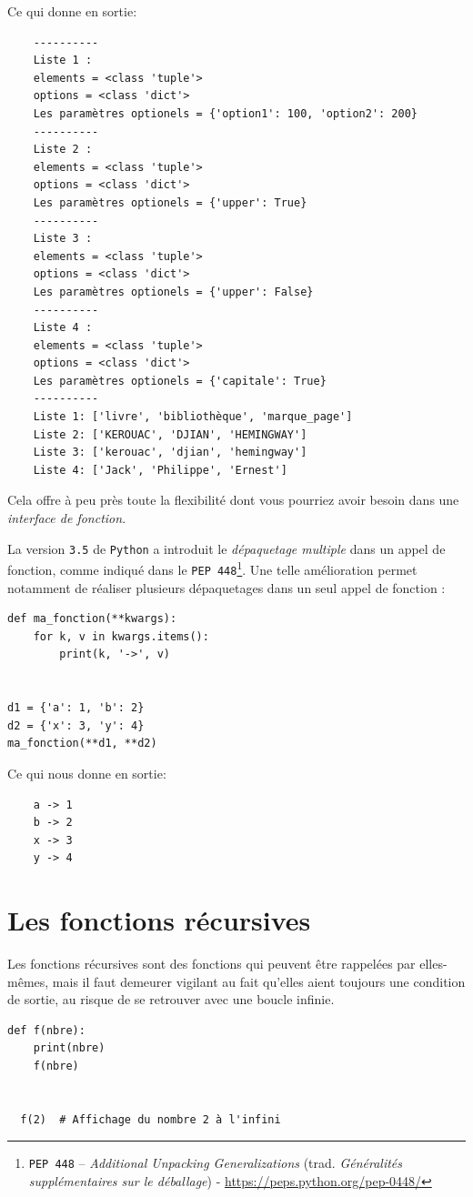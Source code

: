 \documentclass[a4paper,12pt]{book}
\begin{document}
Ce qui donne en sortie:
\begin{verbatim}
    ----------
    Liste 1 : 
    elements = <class 'tuple'>
    options = <class 'dict'>
    Les paramètres optionels = {'option1': 100, 'option2': 200}
    ----------
    Liste 2 : 
    elements = <class 'tuple'>
    options = <class 'dict'>
    Les paramètres optionels = {'upper': True}
    ----------
    Liste 3 : 
    elements = <class 'tuple'>
    options = <class 'dict'>
    Les paramètres optionels = {'upper': False}
    ----------
    Liste 4 : 
    elements = <class 'tuple'>
    options = <class 'dict'>
    Les paramètres optionels = {'capitale': True}
    ----------
    Liste 1: ['livre', 'bibliothèque', 'marque_page']
    Liste 2: ['KEROUAC', 'DJIAN', 'HEMINGWAY']
    Liste 3: ['kerouac', 'djian', 'hemingway']
    Liste 4: ['Jack', 'Philippe', 'Ernest']   
\end{verbatim}
\medskip

Cela offre à peu près toute la flexibilité dont vous pourriez avoir besoin dans une \textit{interface de fonction}.
\medskip

La version \texttt{3.5} de \texttt{Python} a introduit le \textit{dépaquetage multiple} dans un appel de fonction, comme indiqué dans le \texttt{PEP 448}\footnote{\texttt{PEP 448} – \textit{Additional Unpacking Generalizations} (trad. \og \textit{Généralités supplémentaires sur le déballage}\fg{}) - \url{https://peps.python.org/pep-0448/}}. Une telle amélioration permet notamment de réaliser plusieurs dépaquetages dans un seul appel de fonction :
\begin{lstlisting}[caption=Dépaquetage multiple]
def ma_fonction(**kwargs):
    for k, v in kwargs.items():
        print(k, '->', v)


d1 = {'a': 1, 'b': 2}
d2 = {'x': 3, 'y': 4}
ma_fonction(**d1, **d2)
\end{lstlisting}
\medskip

Ce qui nous donne en sortie:
\begin{verbatim}
    a -> 1
    b -> 2
    x -> 3
    y -> 4
\end{verbatim}
\medskip

\section{Les fonctions récursives}
Les fonctions récursives sont des fonctions qui peuvent être rappelées par elles-mêmes, mais il faut demeurer vigilant au fait qu'elles aient toujours une condition de sortie, au risque de se retrouver avec une boucle infinie.
\begin{lstlisting}[caption=Exemple de boucle sans fin]
  def f(nbre):
    print(nbre)
    f(nbre)


  f(2)  # Affichage du nombre 2 à l'infini
\end{lstlisting}
\medskip
 
\end{document}
